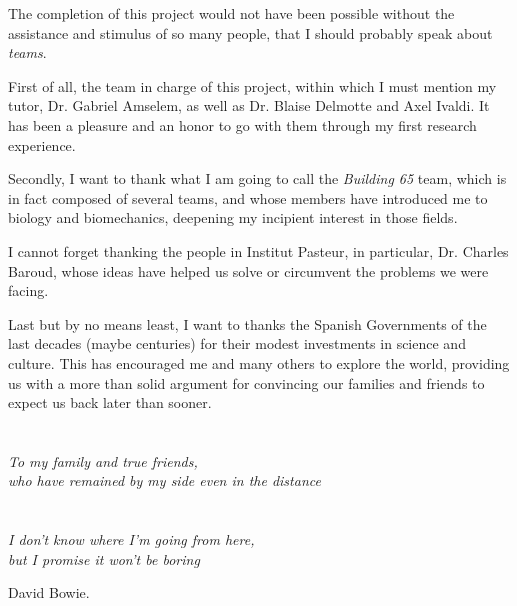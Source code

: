 \thispagestyle{empty}
\vspace{1cm}

The completion of this project would not have been possible without the assistance and stimulus of so many people, that I should probably speak about \textit{teams}.

First of all, the team in charge of this project, within which I must mention my tutor, Dr. Gabriel Amselem, as well as Dr. Blaise Delmotte and Axel Ivaldi. It has been a pleasure and an honor to go with them through my first research experience.

Secondly, I want to thank what I am going to call the \textit{Building 65} team, which is in fact composed of several teams, and whose members have introduced me to biology and biomechanics, deepening my incipient interest in those fields. 

I cannot forget thanking the people in Institut Pasteur, in particular, Dr. Charles Baroud, whose ideas have helped us solve or circumvent the problems we were facing.

Last but by no means least, I want to thanks the Spanish Governments of the last decades (maybe centuries) for their modest investments in science and culture. This has encouraged me and many others to explore the world, providing us with a more than solid argument for convincing our families and friends to expect us back later than sooner.

\cleardoublepage %

\chapter*{}
\setlength{\leftmargin}{0.5\textwidth}
\setlength{\parsep}{0cm}
\addtolength{\topsep}{0.5cm}

\begin{flushright}
	\small\em{
		To my family and true friends,\\
		who have remained by my side even in the distance}
\end{flushright}


\cleardoublepage %

\chapter*{}

\setlength{\leftmargin}{0.5\textwidth}
\setlength{\parsep}{0cm}
\addtolength{\topsep}{0.5cm}
\begin{flushright}
	\small\em{
		I don't know where I'm going from here,\\ 
		but I promise it won't be boring
	}
\end{flushright}

\begin{flushright}
	\small{
		David Bowie.
	}
\end{flushright}

\cleardoublepage %

